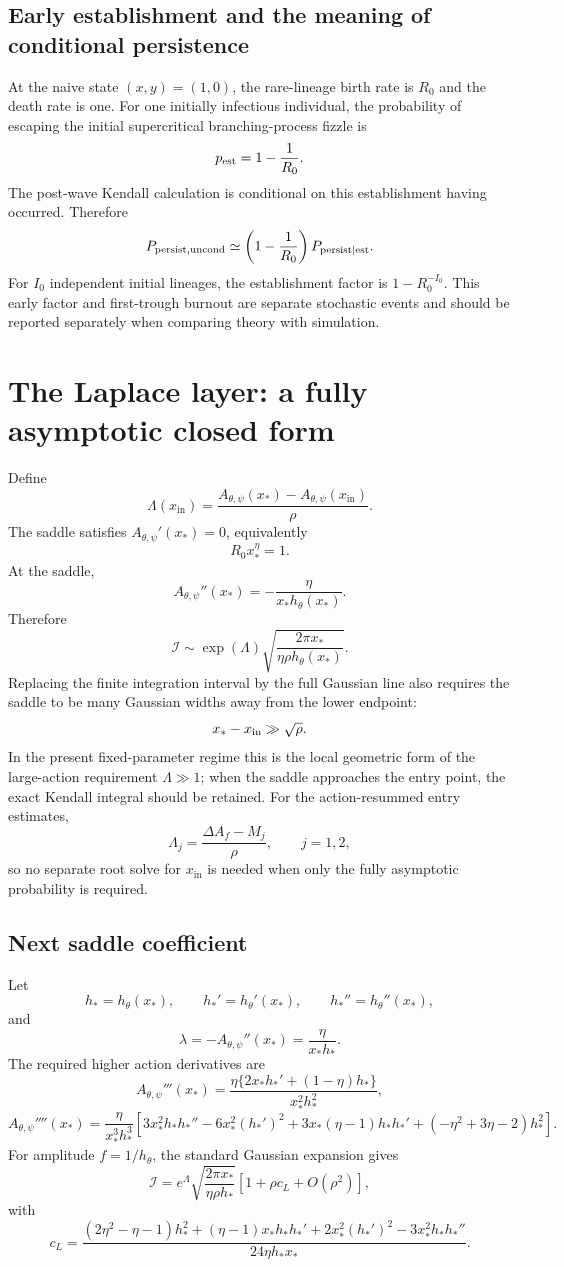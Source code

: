 \documentclass[11pt]{article}
\newcommand{\Rzero}{R_0}
\newcommand{\hth}{h_\theta}
\newcommand{\Apsi}{A_{\theta,\psi}}
\newcommand{\xs}{x_*}
\newcommand{\xin}{x_{\mathrm{in}}}
\begin{document}
\subsection{Early establishment and the meaning of conditional persistence}
At the naive state \((x,y)=(1,0)\), the rare-lineage birth rate is \(R_0\) and the death rate is one. For one initially infectious individual, the probability of escaping the initial supercritical branching-process fizzle is
\[
p_{\rm est}=1-\frac1{R_0}.
\]
The post-wave Kendall calculation is conditional on this establishment having occurred. Therefore
\[
P_{\rm persist,uncond}
\simeq\left(1-\frac1{R_0}\right)P_{\rm persist\mid est}.
\]
For \(I_0\) independent initial lineages, the establishment factor is \(1-R_0^{-I_0}\). This early factor and first-trough burnout are separate stochastic events and should be reported separately when comparing theory with simulation.

\section{The Laplace layer: a fully asymptotic closed form}
Define
\[
\Lambda(\xin)
=\frac{\Apsi(\xs)-\Apsi(\xin)}{\rho}.
\]
The saddle satisfies \(\Apsi'(\xs)=0\), equivalently
\[
\Rzero\xs^\eta=1.
\]
At the saddle,
\[
\Apsi''(\xs)=-\frac{\eta}{\xs\hth(\xs)}.
\]
Therefore
\[
\mathcal I
\sim
\exp(\Lambda)
\sqrt{\frac{2\pi\xs}{\eta\rho\hth(\xs)}}.
\]
Replacing the finite integration interval by the full Gaussian line also requires the saddle to be many Gaussian widths away from the lower endpoint:
\[
x_*-x_{\rm in}\gg\sqrt\rho.
\]
In the present fixed-parameter regime this is the local geometric form of the large-action requirement \(\Lambda\gg1\); when the saddle approaches the entry point, the exact Kendall integral should be retained.
For the action-resummed entry estimates,
\[
\Lambda_j=\frac{\Delta A_f-M_j}{\rho},
\qquad j=1,2,
\]
so no separate root solve for \(\xin\) is needed when only the fully asymptotic probability is required.

\subsection{Next saddle coefficient}
Let
\[
h_*=\hth(\xs),\qquad h_*'=\hth'(\xs),\qquad h_*''=\hth''(\xs),
\]
and
\[
\lambda=-\Apsi''(\xs)=\frac{\eta}{\xs h_*}.
\]
The required higher action derivatives are
\[
\Apsi'''(\xs)
=\frac{\eta\{2\xs h_*'+(1-\eta)h_*\}}
{\xs^2h_*^2},
\]
\[
\Apsi''''(\xs)
=\frac{\eta}{\xs^3h_*^3}
\left[
3\xs^2h_*h_*''-6\xs^2(h_*')^2
+3\xs(\eta-1)h_*h_*'
+(-\eta^2+3\eta-2)h_*^2
\right].
\]
For amplitude \(f=1/\hth\), the standard Gaussian expansion gives
\[
\mathcal I
=e^\Lambda
\sqrt{\frac{2\pi\xs}{\eta\rho h_*}}
\left[1+\rho c_L+O(\rho^2)\right],
\]
with
\[
c_L=
\frac{
(2\eta^2-\eta-1)h_*^2
+(\eta-1)\xs h_*h_*'
+2\xs^2(h_*')^2
-3\xs^2h_*h_*''
}
{24\eta h_*\xs}.
\]
\end{document}
